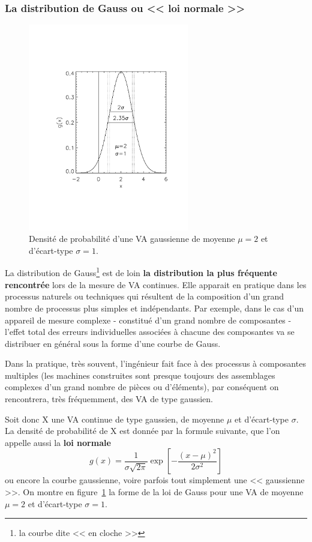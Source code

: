 \documentclass[main.tex]{subfiles}
\begin{document}
\subsubsection{La distribution de Gauss ou << loi normale >>}

\begin{figure}[h!]
    \centering
    \includegraphics[width=7cm]{assets/figures/loiGaussienne.pdf}
    \caption{Densité de probabilité d'une VA gaussienne de moyenne $\mu=2$ et d'écart-type $\sigma=1$.}
    \label{fig:ddpdlldg}
\end{figure}
La distribution de Gauss\footnote{la courbe dite << en cloche >>} est de loin \textbf{la distribution la plus fréquente rencontrée} lors de la mesure de VA continues. Elle apparait en pratique dans les processus naturels ou techniques qui résultent de la composition d'un grand nombre de processus plus simples et indépendants. Par exemple, dans le cas d'un appareil de mesure complexe - constitué d'un grand nombre de composantes - l'effet total des erreurs individuelles associées à chacune des composantes va se distribuer en général sous la forme d'une courbe de Gauss.

Dans la pratique, très souvent, l'ingénieur fait face à des processus à composantes multiples (les machines construites sont presque toujours des assemblages complexes d'un grand nombre de pièces ou d'éléments), par conséquent on rencontrera, très fréquemment, des VA de type gaussien.

Soit donc X une VA continue de type gaussien, de moyenne $\mu$ et d'écart-type $\sigma$. La densité de probabilité de X est donnée par la formule suivante, que l'on appelle aussi la \textbf{loi normale}
\begin{equation}
    g(x)=\frac{1}{\sigma\sqrt{2\pi}}\exp{\left[-\frac{(x-\mu)^2}{2\sigma^2}\right]}
\end{equation}
ou encore la courbe gaussienne, voire parfois tout simplement une << gaussienne >>. On montre en figure~\ref{fig:ddpdlldg} la forme de la loi de Gauss pour une VA de moyenne $\mu=2$ et d'écart-type $\sigma=1$.
\end{document}
